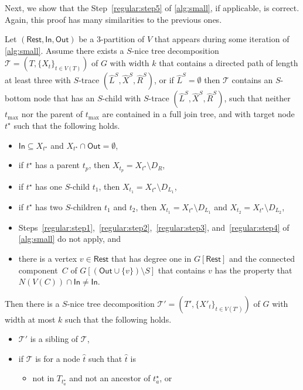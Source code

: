 \documentclass[a4paper,UKenglish,cleveref, autoref, thm-restate, numberwithinsect]{lipics-v2021}
\newcommand{\slim}{\text{slim}\xspace}
\newcommand{\topheavy}{\text{top-heavy}\xspace}
\newcommand{\In}{\mathsf{In}}
\newcommand{\Out}{\mathsf{Out}}
\newcommand{\Rest}{\mathsf{Rest}}
\begin{document}
Next, we show that the Step~\ref{regular:step5} of \cref{alg:small}, if applicable, is correct. Again, this proof has many similarities to the previous ones.

\begin{lemma}\label{lem:regularstep5}
Let $(\Rest,\In,\Out)$ be a 3-partition of $V$ that appears during some iteration of \cref{alg:small}. 
Assume there exists a \slim $S$-nice tree decomposition $\mathcal{T}=(T,\{X_t\}_{t\in V(T)})$ of $G$ with width $k$ that contains a directed path of length at least three with $S$-trace $(\hat{L}^S, \hat{X}^S, \hat{R}^S)$, or if $\hat{L}^S=\emptyset$ then $\mathcal{T}$ contains an $S$-bottom node that has an $S$-child with $S$-trace $(\hat{L}^S, \hat{X}^S, \hat{R}^S)$, such that neither $t_{\max}$ nor the parent of $t_{\max}$ are contained in a full join tree, and with target node ${t^\star}$ such that the following holds.
\begin{itemize}
\item $\In\subseteq X_{t^\star}$ and $X_{t^\star}\cap \Out=\emptyset$, 
                \item if $t^\star$ has a parent $t_p$, then $X_{t_p}=X_{t^\star}\setminus D_R$, 
    \item if $t^\star$ has one $S$-child $t_1$, then $X_{t_1}=X_{t^\star}\setminus D_{L_1}$, 
    \item if $t^\star$ has two $S$-children $t_1$ and $t_2$, then $X_{t_1}=X_{t^\star}\setminus D_{L_1}$ and $X_{t_2}=X_{t^\star}\setminus D_{L_2}$, 
    \item Steps~\ref{regular:step1},~\ref{regular:step2},~\ref{regular:step3}, and~\ref{regular:step4} of \cref{alg:small} do not apply, and
    \item there is a vertex $v\in\Rest$ that has degree one in $G[\Rest]$ and the connected component~$C$ of $G[(\Out\cup\{v\})\setminus S]$ that contains $v$ has the property that $N(V(C))\cap \In\neq \In$.
\end{itemize} 
Then there is a \slim $S$-nice tree decomposition $\mathcal{T}'=(T',\{X'_t\}_{t\in V(T')})$ of $G$ with width at most $k$ 
such that the following holds.
\begin{itemize}
\item $\mathcal{T}'$ is a sibling of $\mathcal{T}$,
\item if $\mathcal{T}$ is \topheavy for a node $\hat{t}$ such that $\hat{t}$ is
\begin{itemize}
    \item not in $T_{t^\star_a}$ and not an ancestor of $t^\star_a$, or

\end{itemize}
\end{itemize}
\end{lemma}
\end{document}
